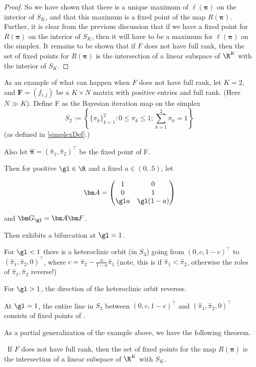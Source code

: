 \begin{proof}
So we have shown that there is a unique maximum of $\ell(\bm\pi)$ on the interior of $S_K$, and that this maximum is a fixed point of the map $R(\bm\pi)$.  Further, it is clear from the previous discussion that if we have a fixed point for $R(\bm\pi)$ on the interior of $S_K$, then it will have to be a maximum for $\ell(\bm\pi)$ on the simplex.  It remains to be shown that if $F$ does not have full rank, then the set of fixed points for $R(\bm\pi)$ is the intersection of a linear subspace of $\R^K$ with the interior of $S_K$.
\end{proof}

As an example of what can happen when $F$ does not have full rank, let \(K=2\), and \(\bm{F}=(f_{i,j})\) be a \(K\times N\) matrix with positive entries and full rank. (Here \(N \gg K\)).  Define \Rpi F as the Bayesian iteration map on  the simplex 
\[S_2:=\left\{\{\pi_k\}_{k=1}^{2}:0\leq \pi_k\leq 1; \sum_{k=1}^{2}\pi_k =1\right\}\]
(as defined in \ref{simplexDef}.)

Also let \(\hat{\bm{\pi}}=(\hat{\pi}_1,\hat{\pi}_2)^\intercal\) be the fixed point of \Rpi F.

Then for positive $\gl\in\R$ and a fixed $a\in(0,.5)$, let 

\[\bm A=\begin{pmatrix}
1 & 0\\
0 & 1\\
\gl a & \gl(1-a)\\
\end{pmatrix}\]

and $\bm G_{\gl}=\bm A\bm F$.

Then  exhibits a bifurcation at $\gl=1$.

For $\gl<1$ there is a heteroclinic orbit (in $S_3$) going from $(0,c,1-c)^{\intercal}$ to $(\hat{\pi}_1,\hat{\pi}_2,0)^\intercal$, where $c=\hat{\pi}_2-\frac{a}{1-a}\hat{\pi}_1$ (note, this is if $\hat{\pi}_1<\hat{\pi}_2$, otherwise the roles of $\hat{\pi}_1,\hat{\pi}_2$ reverse!)

For $\gl>1$, the direction of the heteroclinic orbit reverses.

At $\gl=1$, the entire line in $S_3$ between $(0,c,1-c)^{\intercal}$ and $(\hat{\pi}_1,\hat{\pi}_2,0)^\intercal$ consists of fixed points of .

As a partial generalization of the example above, we have the following theorem.
\begin{thm}\
If $F$ does not have full rank, then the set of fixed points for the map $R(\bm\pi)$ is the intersection of a linear subspace of $\R^K$ with $S_K$.
\end{thm}

